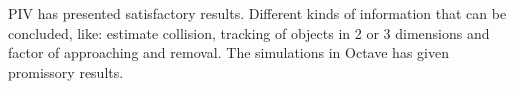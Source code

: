 
PIV has presented satisfactory results. Different kinds of information that can 
be concluded, like: estimate collision, tracking of
objects in 2 or 3 dimensions and factor of approaching and removal. 
The simulations in Octave has given promissory results.

